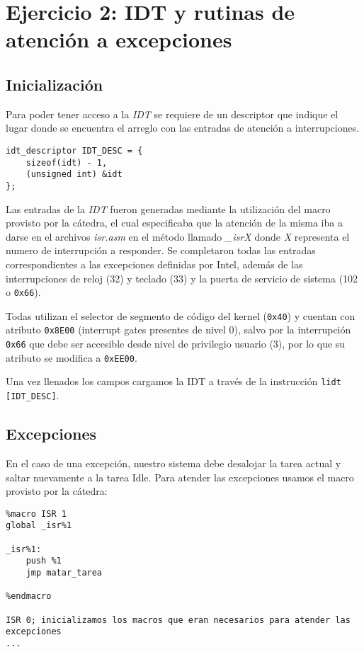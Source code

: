 \section{Ejercicio 2: IDT y rutinas de atención a excepciones}

	\subsection{Inicialización}

	Para poder tener acceso a la \textit{IDT} se requiere de un descriptor que indique el lugar donde se encuentra el arreglo con las entradas de atención a interrupciones. 

	\begin{lstlisting}
idt_descriptor IDT_DESC = {
	sizeof(idt) - 1,
	(unsigned int) &idt
};
	\end{lstlisting}

	Las entradas de la \textit{IDT} fueron generadas mediante la utilización del macro provisto por la cátedra, el cual especificaba que la atención de la misma iba a darse en el archivos \textit{isr.asm} en el método llamado \textit{\_isrX} donde \textit{X} representa el numero de interrupción a responder. Se completaron todas las entradas correspondientes a las excepciones definidas por Intel, además de las interrupciones de reloj (32) y teclado (33) y la puerta de servicio de sistema (102 o \texttt{0x66}).

	Todas utilizan el selector de segmento de código del kernel (\texttt{0x40}) y cuentan con atributo \texttt{0x8E00} (interrupt gates presentes de nivel 0), salvo por la interrupción \texttt{0x66} que debe ser accesible desde nivel de privilegio usuario (3), por lo que su atributo se modifica a \texttt{0xEE00}.

	Una vez llenados los campos cargamos la IDT a través de la instrucción \texttt{lidt [IDT\_DESC]}.

	\subsection{Excepciones}

	En el caso de una excepción, nuestro sistema debe desalojar la tarea actual y saltar nuevamente a la tarea Idle. Para atender las excepciones usamos el macro provisto por la cátedra:

	\begin{lstlisting}
%macro ISR 1
global _isr%1

_isr%1:
    push %1
    jmp matar_tarea

%endmacro

ISR 0; inicializamos los macros que eran necesarios para atender las excepciones
...
	\end{lstlisting}

